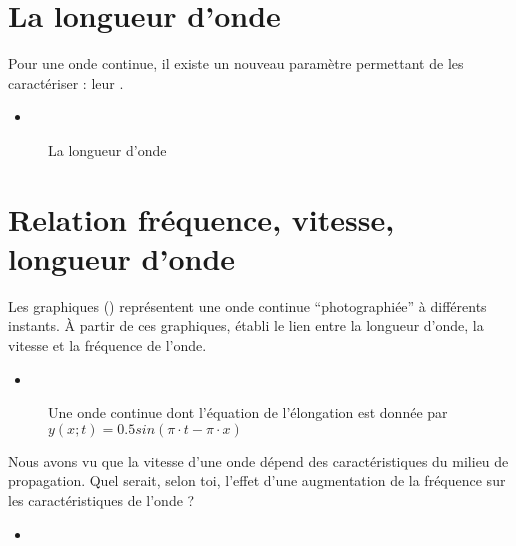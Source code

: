 \section{La longueur d'onde}
Pour une onde continue, il existe un nouveau paramètre permettant de les caractériser : leur .
\begin{itemize}[label=\textbullet]
    \item {}
\end{itemize}

\begin{figure}[ht!]
    \centering
    \resizebox{\linewidth}{!}{}
    \caption{La longueur d'onde}
    \label{longueur_onde}
\end{figure}

\newpage

\section{Relation fréquence, vitesse, longueur d'onde}
Les graphiques () représentent une onde continue \enquote{photographiée} à différents instants. À partir de ces graphiques, établi le lien entre la longueur d'onde, la vitesse et la fréquence de l'onde.
\begin{itemize}[label=\textbullet]
    \item
\end{itemize}
\begin{figure}[ht!]
    \centering
    

    \caption{Une onde continue dont l'équation de l'élongation est donnée par \(y(x ; t)=0.5 sin(\pi \cdot t - \pi \cdot x) \)}
    \label{fig:relation_vitesse_frequence}
\end{figure}

Nous avons vu que la vitesse d'une onde dépend des caractéristiques du milieu de propagation. Quel serait, selon toi, l'effet d'une augmentation de la fréquence sur les caractéristiques de l'onde ?

\begin{itemize}[label=\textbullet]
    \item
\end{itemize}

\newpage

